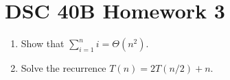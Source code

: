 \documentclass{article}
\begin{document}
\section*{DSC 40B Homework 3}
\begin{enumerate}
  \item Show that $\sum_{i=1}^{n} i = \Theta(n^2)$.
  \item Solve the recurrence $T(n) = 2T(n/2) + n$.
\end{enumerate}
\end{document}
